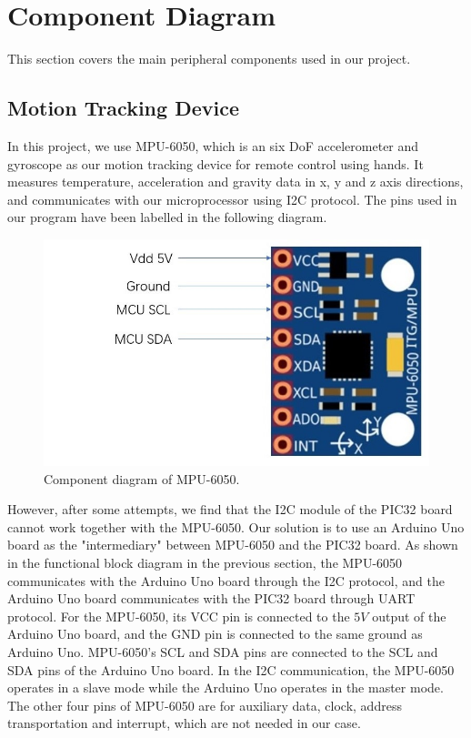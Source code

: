 \documentclass[a4paper]{article}
\begin{document}
\section{Component Diagram}
This section covers the main peripheral components used in our project.
\subsection{Motion Tracking Device}
In this project, we use MPU-6050, which is an six DoF accelerometer and gyroscope as our motion tracking device for remote control using hands. It measures temperature, acceleration and gravity data in x, y and z axis directions, and communicates with our microprocessor using I2C protocol. The pins used in our program have been labelled in the following diagram.
\begin{figure}[H]
    \centering
    \includegraphics[width=1\textwidth]{MPU.jpg}
    \caption{Component diagram of MPU-6050.}
\end{figure}

However, after some attempts, we find that the I2C module of the PIC32 board cannot work together with the MPU-6050. Our solution is to use an Arduino Uno board as the "intermediary" between MPU-6050 and the PIC32 board. As shown in the functional block diagram in the previous section, the MPU-6050 communicates with the Arduino Uno board through the I2C protocol, and the Arduino Uno board communicates with the PIC32 board through UART protocol. For the MPU-6050, its VCC pin is connected to the $5V$ output of the Arduino Uno board, and the GND pin is connected to the same ground as Arduino Uno. MPU-6050's SCL and SDA pins are connected to the SCL and SDA pins of the Arduino Uno board. In the I2C communication, the MPU-6050 operates in a slave mode while the Arduino Uno operates in the master mode. The other four pins of MPU-6050 are for auxiliary data, clock, address transportation and interrupt, which are not needed in our case.
\end{document}
